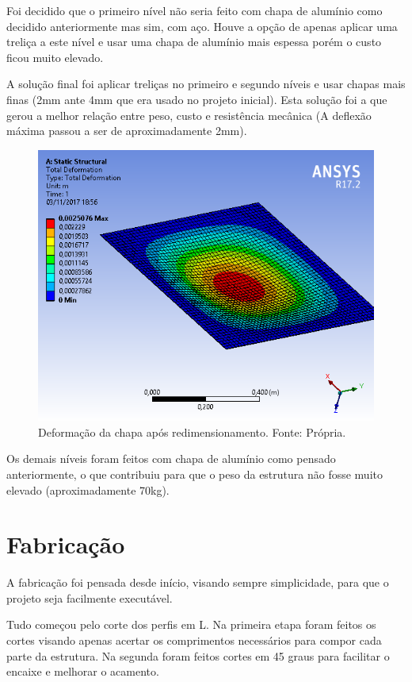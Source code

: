   Foi decidido que o primeiro nível não seria feito com chapa de alumínio como decidido 
  anteriormente mas sim, com aço. Houve a opção de apenas aplicar uma treliça a este nível e 
  usar uma chapa de alumínio mais espessa porém o custo ficou muito elevado.

  A solução final foi aplicar treliças no primeiro e segundo níveis e usar chapas mais finas 
  (2mm ante 4mm que era usado no projeto inicial). Esta solução foi a que gerou a melhor relação 
  entre peso, custo e resistência mecânica (A deflexão máxima passou a ser de aproximadamente 2mm).

  \begin{figure}[H]
    \centering
    \includegraphics[scale= 0.6]{figuras/estrutura/deformacao-da-chapa.png}
    \caption{Deformação da chapa após redimensionamento. Fonte: Própria.}
    \label{modelagem}
  \end{figure}

  Os demais níveis foram feitos com chapa de alumínio como pensado anteriormente, 
  o que contribuiu para que o peso da estrutura não fosse muito elevado (aproximadamente 70kg).
  
  \section[Fabricação]{Fabricação}

  A fabricação foi pensada desde início, visando sempre simplicidade, 
  para que o projeto seja facilmente executável.

  Tudo começou pelo corte dos perfis em L. Na primeira etapa foram feitos os cortes 
  visando apenas acertar os comprimentos necessários para compor cada parte da estrutura. 
  Na segunda foram feitos cortes em 45 graus para facilitar o encaixe e melhorar o acamento.
  
